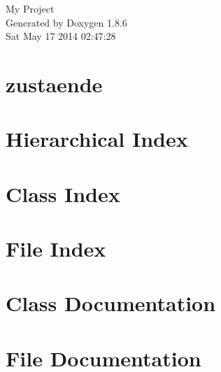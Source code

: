 \documentclass[twoside]{book}
\newcommand{\clearemptydoublepage}{%
  \newpage{\pagestyle{empty}\cleardoublepage}%
}
\begin{document}
\hypersetup{pageanchor=false}
\begin{titlepage}
\vspace*{7cm}
\begin{center}%
{\Large My Project }\\
\vspace*{1cm}
{\large Generated by Doxygen 1.8.6}\\
\vspace*{0.5cm}
{\small Sat May 17 2014 02:47:28}\\
\end{center}
\end{titlepage}
\clearemptydoublepage
\tableofcontents
\clearemptydoublepage
{}
\hypersetup{pageanchor=true}

\chapter{zustaende}
\label{md_frontend_parse_zustaende}
\hypertarget{md_frontend_parse_zustaende}{}

\chapter{Hierarchical Index}

\chapter{Class Index}

\chapter{File Index}

\chapter{Class Documentation}



















\chapter{File Documentation}

























\newpage
{}
{}
\printindex
\end{document}

